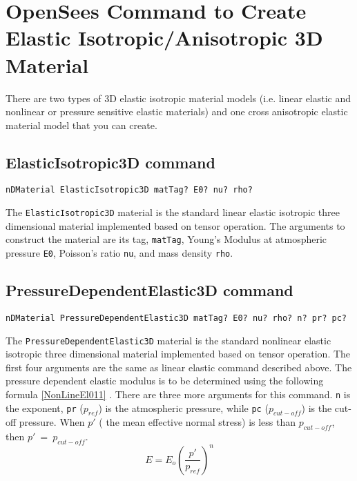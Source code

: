 \section{OpenSees Command to Create Elastic Isotropic/Anisotropic 3D Material }


There  are  two  types  of  3D  elastic  isotropic material models
(i.e.  linear  elastic  and  nonlinear or pressure
sensitive elastic materials)
 and one cross
anisotropic elastic material model that  you
can  create.


\subsection{ElasticIsotropic3D command}
\label{LinEla}
\begin{verbatim}
nDMaterial ElasticIsotropic3D matTag? E0? nu? rho?
\end{verbatim}

The  \texttt{ElasticIsotropic3D}  material  is the standard linear elastic
isotropic  three  dimensional  material  implemented  based  on
tensor  operation.  The arguments to construct the material are
its tag, \texttt{matTag}, Young's Modulus at atmospheric pressure \texttt{E0},
Poisson's ratio \texttt{nu}, and mass density \texttt{rho}.




\subsection{PressureDependentElastic3D command}
\label{NonlEla}
\begin{verbatim}
nDMaterial PressureDependentElastic3D matTag? E0? nu? rho? n? pr? pc? 
\end{verbatim}

The  \texttt{PressureDependentElastic3D}  material  is the standard
nonlinear   elastic   isotropic   three   dimensional  material
implemented based on tensor operation. The first four arguments
are  the  same  as  linear elastic command described above. 
The pressure  dependent  elastic  modulus is to be determined using
the following formula \ref{NonLineEl011}
.  
There  are  three  more  arguments for this command. 
\texttt{n} is  the  exponent, 
\texttt{pr} ($p_{ref}$) is  the  atmospheric pressure, 
while \texttt{pc} ($p_{cut-off}$) is the cut-off pressure. 
When $p'$ ( the mean effective normal stress) is less than $p_{cut-off}$,
then $p'~=~p_{cut-off}$.
%
\begin{equation}
E = E_o \left(\frac{p'}{p_{ref}}\right)^{n}
\label{NonLineEl011}
\end{equation}
%

